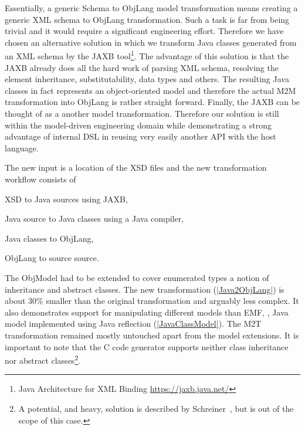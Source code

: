 \label{sec:Extension3}

\enlargethispage{20mm}

Essentially, a generic \FIXML Schema to ObjLang model transformation means creating a generic XML schema to ObjLang transformation.
Such a task is far from being trivial and it would require a significant engineering effort.
Therefore we have chosen an alternative solution in which we transform Java classes generated from an XML schema by the JAXB tool\footnote{Java Architecture for XML Binding \url{https://jaxb.java.net/}}.
The advantage of this solution is that the JAXB already does all the hard work of parsing XML schema, resolving the element inheritance, substitutability, data types and others.
The resulting Java classes in fact represents an object-oriented model and therefore the actual M2M transformation into ObjLang is rather straight forward.
Finally, the JAXB can be thought of as a another model transformation. Therefore our solution is still within the model-driven engineering domain while demonstrating a strong advantage of internal DSL in reusing very easily another API with the host language.

The new input is a location of the \FIXML XSD files and the new transformation workflow consists of 
\begin{inparaenum}[(1)]
	\item XSD to Java sources using JAXB,
	\item Java source to Java classes using a Java compiler,
	\item Java classes to ObjLang,
	\item ObjLang to source source.
\end{inparaenum}
%
The ObjModel had to be extended to cover enumerated types a notion of inheritance and abstract classes.
%
The new transformation (\href{https://github.com/fikovnik/ttc14-fixml-sigma/blob/master/ttc14-fixml-extension-3/src/fr/inria/spirals/sigma/ttc14/fixml/Java2ObjLang.scala}{\Scala|Java2ObjLang|}) is about 30\% smaller than the original transformation and arguably less complex.
It also demonstrates \SIGMA support for manipulating different models than EMF, \Ie, Java model implemented using Java reflection (\href{https://github.com/fikovnik/ttc14-fixml-sigma/blob/master/ttc14-fixml-extension-3/src/fr/inria/spirals/sigma/ttc14/fixml/javamm/JavaClassModel.scala}{\Scala|JavaClassModel|}).
The M2T transformation remained mostly untouched apart from the model extensions.
It is important to note that the C code generator supports neither class inheritance nor abstract classes\footnote{A potential, and heavy, solution is described  by Schreiner~\cite{Schreiner1993}, but is out of the scope of this \TTC case.}.
